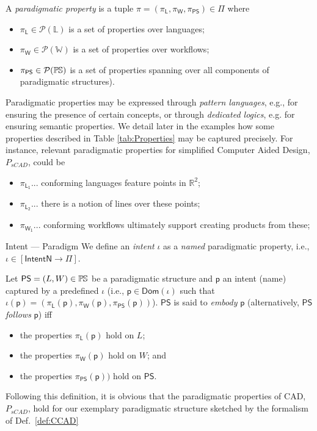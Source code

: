 \begin{Definition}
   A \emph{paradigmatic property} is a tuple 
$\pi = (\pi_{\mathsf{L}},\pi_{\mathsf{W}},\pi_{\mathsf{PS}}) \in \Pi$ where
\begin{itemize}
   \item $\pi_{\mathsf{L}} \in \mathcal{P}(\mathbb{L})$ is a set of properties 
over languages;
   \item $\pi_{\mathsf{W}} \in \mathcal{P}(\mathbb{W})$ is a set of properties 
over workflows;
   \item $\pi_{\mathsf{PS}}\in\mathcal{P}(\mathbb{P}\mskip-1mu\mathbb{S})$ is a set of 
properties spanning over all components of paradigmatic structures).
\end{itemize}
\end{Definition}
\noindent
Paradigmatic properties may be expressed through \emph{pattern languages}, e.g., 
for ensuring the presence of certain concepts, or through \emph{dedicated 
logics}, e.g. for ensuring semantic properties. We detail later in the examples 
how some properties described in Table \ref{tab:Properties} may be captured 
precisely.
For instance, relevant paradigmatic properties for simplified Computer Aided Design, $P_{sCAD}$, could be \begin{itemize}
    \item $\pi_{\mathsf{L_1}}...$ conforming languages feature points in $\mathbb{R}^2$;
    \item $\pi_{\mathsf{L_2}}... $ there is a notion of lines over these points; 
    \item $\pi_{\mathsf{W_1}}...$ conforming workflows ultimately support creating products from these;
\end{itemize}


\begin{Definition}{\label{def:Paradigm}Intent --- Paradigm}
We define an \emph{intent} $\iota$ as a \emph{named} paradigmatic property, 
i.e., $\iota \in [\mathsf{IntentN} \to \Pi]$.

   Let $\mathsf{PS} = (L, W)\in\mathbb{P}\mskip-1mu\mathbb{S}$ be a paradigmatic structure and 
$\mathsf{p}$ an intent (name) captured by a predefined $\iota$ (i.e., 
$\mathsf{p}\in \mathsf{Dom}(\iota)$ such that 
$\iota(\mathsf{p}) = (\pi_{\mathsf{L}}(\mathsf{p}), 
                     \pi_{\mathsf{W}}(\mathsf{p}), 
                     \pi_{\mathsf{PS}}(\mathsf{p}))$). 
$\mathsf{PS}$ is said to \emph{embody} $\mathsf{p}$ (alternatively, 
$\mathsf{PS}$ \emph{follows} $\mathsf{p}$) iff 
\begin{itemize}
   \item the properties $\pi_{\mathsf{L}}(\mathsf{p})$ hold on $L$;
   \item the properties $\pi_{\mathsf{W}}(\mathsf{p})$ hold on $W$; and
   \item the properties $ \pi_{\mathsf{PS}}(\mathsf{p}))$ hold on $\mathsf{PS}$.
\end{itemize}
\end{Definition}

\begin{Example}
\end{Example}

Following this definition, it is obvious that the paradigmatic properties of CAD, $P_{sCAD}$, hold for our exemplary \CCad paradigmatic structure sketched by the formalism of Def.~\ref{def:CCAD}
